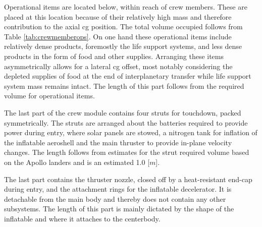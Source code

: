 Operational items are located below, within reach of crew members. These are placed at this location because of their relatively high mass and therefore contribution to the axial \gls{cg} position. The total volume occupied follows from Table \ref{tab:crewmemberops}. On one hand these operational items include relatively dense products, foremostly the life support systems, and less dense products in the form of food and other supplies. Arranging these items asymmetrically allows for a lateral \gls{cg} offset, most notably considering the depleted supplies of food at the end of interplanetary transfer while life support system mass remains intact. The length of this part follows from the required volume for operational items.

The last part of the crew module contains four struts for touchdown, packed symmetrically. The struts are arranged about the batteries required to provide power during entry, where solar panels are stowed, a nitrogen tank for inflation of the inflatable aeroshell and the main thruster to provide in-plane velocity changes. The length follows from estimates for the strut required volume based on the Apollo landers and is an estimated 1.0 [$m$]. 

The last part contains the thruster nozzle, closed off by a heat-resistant end-cap during entry, and the attachment rings for the inflatable decelerator. It is detachable from the main body and thereby does not contain any other subsystems. The length of this part is mainly dictated by the shape of the inflatable and where it attaches to the centerbody.


